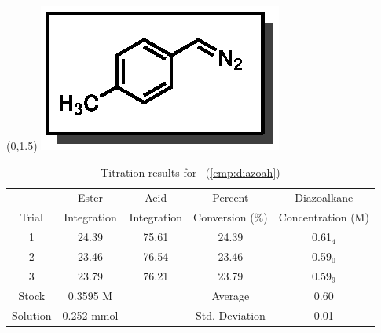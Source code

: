 \begin{singlespace}
\begin{table}[htbp]
\begin{textblock}{1}(0,1.5)
\includegraphics[scale=0.8]{chp_asymmetric/images/diazoah}
\end{textblock}
\flushright
{\small
\begin{tabular}{ccccc} 
\toprule
&Ester&Acid&Percent&Diazoalkane\\
Trial&Integration&Integration&Conversion (\%)&Concentration (M) \\ 
\midrule
1 & 24.39 & 75.61 & 24.39 & 0.61$_4$ \\
2 & 23.46 & 76.54 & 23.46 & 0.59$_0$ \\
3 & 23.79 & 76.21 & 23.79 & 0.59$_9$ \\
\midrule
Stock & 0.3595 M & & Average & 0.60 \\
Solution & 0.252 mmol & & Std. Deviation & 0.01 \\
\bottomrule
\end{tabular}
\caption{Titration results for \CMPdiazoah~(\ref{cmp:diazoah})}
}
\end{table}
\end{singlespace}

